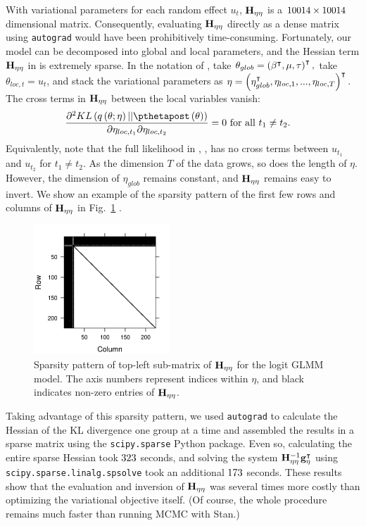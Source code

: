 \documentclass{article}\usepackage[]{graphicx}\usepackage[]{color}
\theoremstyle{definition}
\theoremstyle{plain}
\theoremstyle{plain}
\theoremstyle{plain}
\theoremstyle{definition}
\theoremstyle{plain}
\theoremstyle{plain}
\newcommand{\fig}[1]{Fig.~\ref{fig:#1}}
\begin{document}
With variational parameters for each random effect $u_{t}$, $\mathbf{H}_{\eta\eta}$
is a $10014\times10014$ dimensional matrix. Consequently,
evaluating $\mathbf{H}_{\eta\eta}$ directly as a dense matrix using \texttt{autograd}
would have been prohibitively time-consuming. Fortunately, our model
can be decomposed into global and local parameters, and the Hessian
term $\mathbf{H}_{\eta\eta}$ in  is extremely sparse.
In the notation of , take
$\theta_{glob}=\left(\beta^{\intercal},\mu,\tau\right)^{\intercal},$
take $\theta_{loc,t}=u_{t}$, and stack the variational parameters
as $\eta=\left(\eta_{glob}^{\intercal},\eta_{loc,1},...,\eta_{loc,T}\right)^{\intercal}$.
The cross terms in $\mathbf{H}_{\eta\eta}$ between the local variables vanish:
\begin{align*}
\frac{\partial^{2}KL\left(q\left(\theta;\eta\right)||
    \pthetapost\left(\theta\right)\right)}{\partial\eta_{loc,t_{1}}
    \partial\eta_{loc,t_{2}}} & =0\textrm{ for all }t_{1}\ne t_{2}.
\end{align*}
Equivalently, note that the full likelihood in ,
, has no cross terms between $u_{t_{1}}$
and $u_{t_{2}}$ for $t_{1}\ne t_{2}$. As the dimension $T$ of the
data grows, so does the length of $\eta$. However, the dimension
of $\eta_{glob}$ remains constant, and $\mathbf{H}_{\eta\eta}$ remains easy to
invert. We show an example of the sparsity pattern of the first few
rows and columns of $\mathbf{H}_{\eta\eta}$ in \fig{LogitGLMMHessianSparsity}
.

\begin{figure}[h]
\centering{}\includegraphics[width=2in]{static_images/logit_sparsity.png}
\caption{Sparsity pattern of top-left sub-matrix of $\protect\mathbf{H}_{\eta\eta}$
for the logit GLMM model.
The axis numbers represent indices within $\eta$,
and black indicates non-zero entries of $\protect\mathbf{H}_{\eta\eta}$.}
\label{fig:LogitGLMMHessianSparsity}
\end{figure}


Taking advantage of this sparsity pattern, we used \texttt{autograd}
to calculate the Hessian of the KL divergence one group at a time
and assembled the results in a sparse matrix using the \texttt{scipy.sparse}
Python package. Even so, calculating the entire sparse Hessian took
$323$ seconds, and solving the system $\mathbf{H}_{\eta\eta}^{-1}\mathbf{g}_{\eta}^{\intercal}$
using \texttt{scipy.sparse.linalg.spsolve} took an additional $173$
seconds. These results show that the evaluation and inversion of $\mathbf{H}_{\eta\eta}$
was several times more costly than optimizing the variational objective
itself. (Of course, the whole procedure remains much faster than running
MCMC with Stan.)
\end{document}
